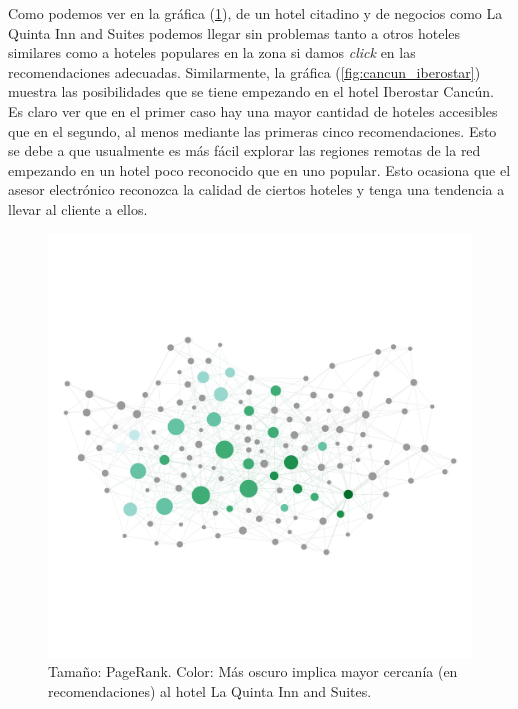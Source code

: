 \documentclass[12pt]{report}
\begin{document}
Como podemos ver en la gráfica (\ref{fig:cancun_laquinta}), de un hotel citadino y de negocios como La Quinta Inn and Suites podemos llegar sin problemas tanto a otros hoteles similares como a hoteles populares en la zona si damos \emph{click} en las recomendaciones adecuadas. Similarmente, la gráfica (\ref{fig:cancun_iberostar}) muestra las posibilidades que se tiene empezando en el hotel Iberostar Cancún. Es claro ver que en el primer caso hay una mayor cantidad de hoteles accesibles que en el segundo, al menos mediante las primeras cinco recomendaciones. Esto se debe a que usualmente es más fácil explorar las regiones remotas de la red empezando en un hotel poco reconocido que en uno popular. Esto ocasiona que el asesor electrónico reconozca la calidad de ciertos hoteles y tenga una tendencia a llevar al cliente a ellos. 
\begin{figure}[ht]
	\centering
	\includegraphics[height=0.75\textwidth, angle=90,
		trim = 100 900 100 900, clip]{imagenes/cancun_laquinta2.png}
	\caption{\label{fig:cancun_laquinta} Tamaño: PageRank. Color: Más oscuro implica mayor cercanía (en recomendaciones) al hotel La Quinta Inn and Suites.}
\end{figure}
\end{document}

